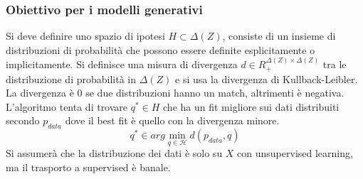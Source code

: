 		\subsubsection{Obiettivo per i modelli generativi}
		Si deve definire uno spazio di ipotesi $H\subset \Delta(Z)$, consiste di un insieme di distribuzioni di probabilit\`a che possono essere definite esplicitamente o implicitamente.
		Si definisce una misura di divergenza $d\in R_+^{\Delta(Z)\times\Delta(Z)}$ tra le distribuzione di probabilit\`a in $\Delta(Z)$ e si usa la divergenza di Kullback-Leibler.
		La divergenza \`e $0$ se due distribuzioni hanno un match, altrimenti \`e negativa.
		L'algoritmo tenta di trovare $q^*\in H$ che ha un fit migliore sui dati distribuiti secondo $p_{data}$ dove il best fit \`e quello con la divergenza minore.
		$$q^*\in arg\min\limits_{q\in\mathcal{H}}d(p_{data},q)$$
		Si assumer\`a che la distribuzione dei dati \`e solo su $X$ con unsupervised learning, ma il trasporto a supervised \`e banale.

